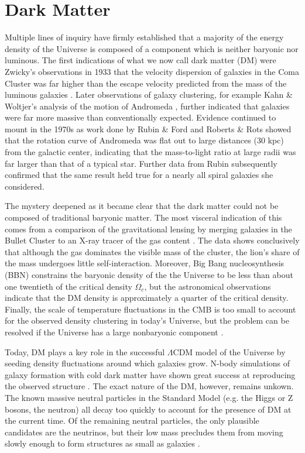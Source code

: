 \section{Dark Matter}
Multiple lines of inquiry have firmly established that a majority of the energy density of the Universe is composed of a component which is neither baryonic nor luminous. The first indications of what we now call dark matter (DM) were Zwicky's observations in 1933 that the velocity dispersion of galaxies in the Coma Cluster was far higher than the escape velocity predicted from the mass of the luminous galaxies \cite{zwicky_1933}. Later observations of galaxy clustering, for example Kahn \& Woltjer's analysis of the motion of Andromeda \cite{kahn_intergalactic_1959}, further indicated that galaxies were far more massive than conventionally expected. Evidence continued to mount in the 1970s as work done by Rubin \& Ford \cite{rubin_rotation_1970} and Roberts \& Rots \cite{roberts_comparison_1973} showed that the rotation curve of Andromeda was flat out to large distances (30 kpc) from the galactic center, indicating that the mass-to-light ratio at large radii was far larger than that of a typical star. Further data from Rubin \cite{rubin_extended_1978} subsequently confirmed that the same result held true for a nearly all spiral galaxies she considered. 
 
The mystery deepened as it became clear that the dark matter could not be composed of traditional baryonic matter. The most visceral indication of this comes from a comparison of the gravitational lensing by merging galaxies in the Bullet Cluster to an X-ray tracer of the gas content \cite{clowe_direct_2006}. The data shows conclusively that although the gas dominates the visible mass of the cluster, the lion's share of the mass undergoes little self-interaction. Moreover, Big Bang nucleosynthesis (BBN) constrains the baryonic density of the the Universe to be less than about one twentieth of the critical density $\Omega_c$, but the astronomical observations indicate that the DM density is approximately a quarter of the critical density. Finally, the scale of temperature fluctuations in the CMB is too small to account for the observed density clustering in today's Universe, but the problem can be resolved if the Universe has a large nonbaryonic component \cite{einasto_dark_2009}.

Today, DM plays a key role in the successful $\Lambda$CDM model of the Universe by seeding density fluctuations around which galaxies grow.
N-body simulations of galaxy formation with cold dark matter have shown great success at reproducing the observed structure \cite{bertone_particle_2010}.
The exact nature of the DM, however, remains unkown.
The known massive neutral particles in the Standard Model (e.g. the Higgs or Z bosons, the neutron) all decay too quickly to account for the presence of DM at the current time. Of the remaining neutral particles, the only plausible candidates are the neutrinos, but their low mass precludes them from moving slowly enough to form structures as small as galaxies \cite{einasto_dark_2009}. 

